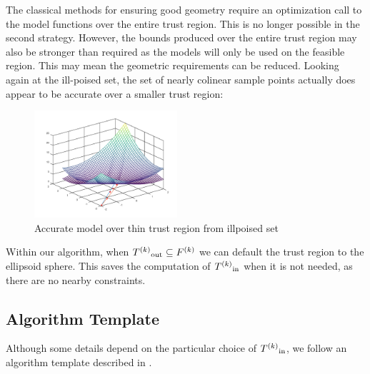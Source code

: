 The classical methods for ensuring good geometry require an optimization call to the model functions over the entire trust region.
This is no longer possible in the second strategy.
However, the bounds produced over the entire trust region may also be stronger than required as the models will only be used on the feasible region.
This may mean the geometric requirements can be reduced.
Looking again at the ill-poised set, the set of nearly colinear sample points actually does appear to be accurate over a smaller trust region:


\begin{figure}[h]
    \centering
    \includegraphics[width=200px]{images/poised_bad_but_good.png}
    \caption{Accurate model over thin trust region from illpoised set}
    \label{aoip}
\end{figure}


Within our algorithm, when $ {T^{(k)}}_{\text{out}} \subseteq {F}^{(k)}$ we can default the trust region to the ellipsoid sphere.
This saves the computation of ${T^{(k)}}_{\text{in}}$ when it is not needed, as there are no nearby constraints.

\subsection{Algorithm Template}

Although some details depend on the particular choice of ${T^{(k)}}_{\text{in}}$, we follow an algorithm template described in \cite{doi:10.1080/10556788.2015.1026968}.


